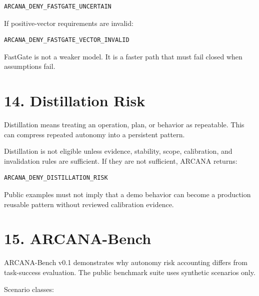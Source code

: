 \documentclass[
  american,
  a4paper,
  10pt]{article}
\begin{document}
\begin{Verbatim}[breaklines=true,breakanywhere=true,fontsize=\small]
ARCANA_DENY_FASTGATE_UNCERTAIN
\end{Verbatim}

If positive-vector requirements are invalid:

\begin{Verbatim}[breaklines=true,breakanywhere=true,fontsize=\small]
ARCANA_DENY_FASTGATE_VECTOR_INVALID
\end{Verbatim}

FastGate is not a weaker model. It is a faster path that must fail closed when
assumptions fail.

\section{14. Distillation Risk}\label{14-distillation-risk}

Distillation means treating an operation, plan, or behavior as repeatable. This can
compress repeated autonomy into a persistent pattern.

Distillation is not eligible unless evidence, stability, scope, calibration, and
invalidation rules are sufficient. If they are not sufficient, ARCANA returns:

\begin{Verbatim}[breaklines=true,breakanywhere=true,fontsize=\small]
ARCANA_DENY_DISTILLATION_RISK
\end{Verbatim}

Public examples must not imply that a demo behavior can become a production reusable
pattern without reviewed calibration evidence.

\section{15. ARCANA-Bench}\label{15-arcana-bench}

ARCANA-Bench v0.1 demonstrates why autonomy risk accounting differs from task-success
evaluation. The public benchmark suite uses synthetic scenarios only.

Scenario classes:
\end{document}
